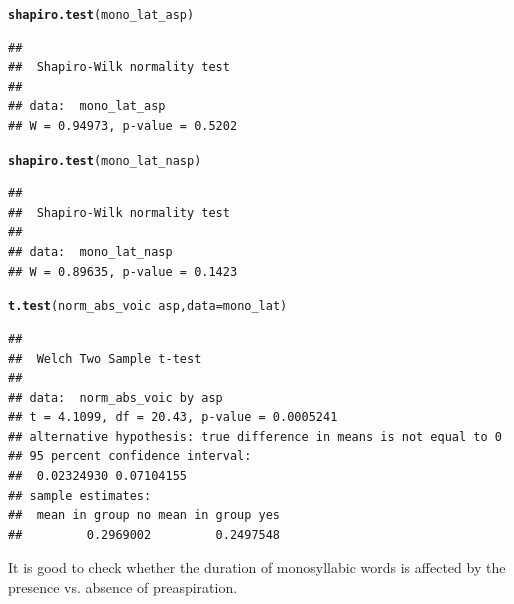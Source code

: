 \documentclass[a4paper,11pt]{article}\usepackage[]{graphicx}\usepackage[]{color}
\makeatletter
\newcommand{\hlopt}[1]{\textcolor[rgb]{0,0,0}{#1}}%
\newcommand{\hlstd}[1]{\textcolor[rgb]{0.345,0.345,0.345}{#1}}%
\newcommand{\hlkwc}[1]{\textcolor[rgb]{0.333,0.667,0.333}{#1}}%
\newcommand{\hlkwd}[1]{\textcolor[rgb]{0.737,0.353,0.396}{\textbf{#1}}}%
\newenvironment{kframe}{%
 \def\at@end@of@kframe{}%
 \ifinner\ifhmode%
  \def\at@end@of@kframe{\end{minipage}}%
  \begin{minipage}{\columnwidth}%
 \fi\fi%
 \def\FrameCommand##1{\hskip\@totalleftmargin \hskip-\fboxsep
 \colorbox{shadecolor}{##1}\hskip-\fboxsep
     \hskip-\linewidth \hskip-\@totalleftmargin \hskip\columnwidth}%
 \MakeFramed {\advance\hsize-\width
   \@totalleftmargin\z@ \linewidth\hsize
   \@setminipage}}%
 {\par\unskip\endMakeFramed%
 \at@end@of@kframe}
\newenvironment{knitrout}{}{} %
\makeatother
\begin{document}
\begin{knitrout}
\color{fgcolor}\begin{kframe}
\begin{alltt}
\hlkwd{shapiro.test}\hlstd{(mono_lat_asp)}
\end{alltt}
\begin{verbatim}
## 
## 	Shapiro-Wilk normality test
## 
## data:  mono_lat_asp
## W = 0.94973, p-value = 0.5202
\end{verbatim}
\begin{alltt}
\hlkwd{shapiro.test}\hlstd{(mono_lat_nasp)}
\end{alltt}
\begin{verbatim}
## 
## 	Shapiro-Wilk normality test
## 
## data:  mono_lat_nasp
## W = 0.89635, p-value = 0.1423
\end{verbatim}
\begin{alltt}
\hlkwd{t.test}\hlstd{(norm_abs_voic} \hlopt{~} \hlstd{asp,} \hlkwc{data} \hlstd{= mono_lat)}
\end{alltt}
\begin{verbatim}
## 
## 	Welch Two Sample t-test
## 
## data:  norm_abs_voic by asp
## t = 4.1099, df = 20.43, p-value = 0.0005241
## alternative hypothesis: true difference in means is not equal to 0
## 95 percent confidence interval:
##  0.02324930 0.07104155
## sample estimates:
##  mean in group no mean in group yes 
##         0.2969002         0.2497548
\end{verbatim}
\end{kframe}
\end{knitrout}

It is good to check whether the duration of monosyllabic words is affected by the presence vs. absence of preaspiration.
\end{document}
